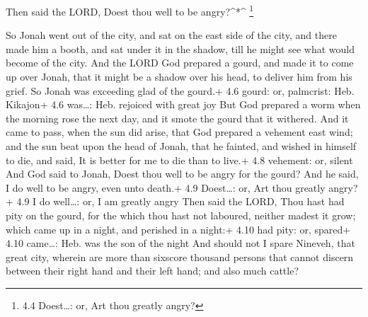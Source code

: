 Then said the LORD, Doest thou well to be angry?\^{}*\^{}
\footnote{4.4 Doest\ldots: or, Art thou greatly angry?}

 So Jonah went out of the city, and sat on the east side of
the city, and there made him a booth, and sat under it in the shadow,
till he might see what would become of the city.  And the
LORD God prepared a gourd, and made it to come up over Jonah, that it
might be a shadow over his head, to deliver him from his grief. So Jonah
was exceeding glad of the gourd.+ 4.6 gourd: or, palmcrist: Heb.
Kikajon+ 4.6 was\ldots: Heb. rejoiced with great joy  But
God prepared a worm when the morning rose the next day, and it smote the
gourd that it withered.  And it came to pass, when the sun
did arise, that God prepared a vehement east wind; and the sun beat upon
the head of Jonah, that he fainted, and wished in himself to die, and
said, It is better for me to die than to live.+ 4.8 vehement: or, silent
 And God said to Jonah, Doest thou well to be angry for the
gourd? And he said, I do well to be angry, even unto death.+ 4.9
Doest\ldots: or, Art thou greatly angry?+ 4.9 I do well\ldots: or, I am
greatly angry  Then said the LORD, Thou hast had pity on
the gourd, for the which thou hast not laboured, neither madest it grow;
which came up in a night, and perished in a night:+ 4.10 had pity: or,
spared+ 4.10 came\ldots: Heb. was the son of the night  And
should not I spare Nineveh, that great city, wherein are more than
sixscore thousand persons that cannot discern between their right hand
and their left hand; and also much cattle?

